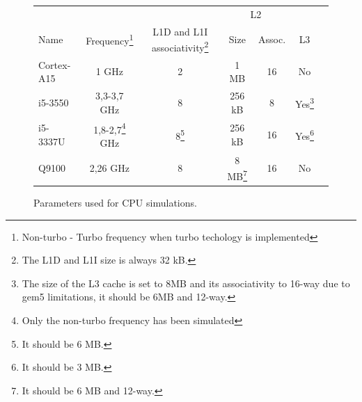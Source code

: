 \documentclass{article}
\begin{document}
\begin{figure}[ht]
\begin{center}

\begin{tabular}{| l | c | c | c | c | c | c |}
\hline 
& & & \multicolumn{2}{c|}{L2} &\\
Name & Frequency\footnote{Non-turbo - Turbo frequency when turbo techology is implemented} & L1D and L1I associativity\footnote{The L1D and L1I size is always 32 kB.} & Size & Assoc. & L3 \\
\hline

Cortex-A15 & 1 GHz & 2 & 1 MB & 16 & No \\

i5-3550 & 3,3-3,7 GHz & 8 & 256 kB & 8 & Yes\footnote{The size of the L3 cache is set to 8MB and its associativity to 16-way due to gem5 limitations, it should be 6MB and 12-way.}\\

i5-3337U & 1,8-2,7\footnote{Only the non-turbo frequency has been simulated} GHz & 8\footnote{It should be 6 MB.} & 256 kB & 16 & Yes\footnote{It should be 3 MB.}\\

Q9100 & 2,26 GHz & 8 & 8 MB\footnote{It should be $6$ MB and 12-way.} & 16 & No\\



\hline

\end{tabular}
\caption{\label{cpu_setup}Parameters used for CPU simulations.}
\end{center}
\end{figure}
\end{document}
